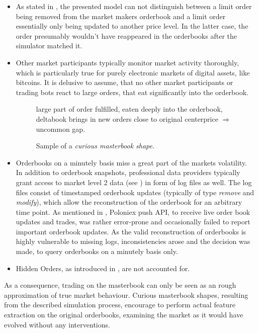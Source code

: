 \begin{itemize}
\item As stated in , the presented model can not distinguish between a limit order being removed from the market makers orderbook and a limit order essentially only being updated to another price level. In the latter case, the order presumably wouldn't have reappeared in the orderbooks after the simulator matched it.
\item Other market participants typically monitor market activity thoroughly, which is particularly true for purely electronic markets of digital assets, like bitcoins. It is delusive to assume, that no other market participants or trading bots react to large orders, that eat significantly into the orderbook.\\

\begin{figure}[ht]
	\centering
	[placeholder]
	\caption{Sample of a \emph{curious masterbook shape}.}
	large part of order fulfilled, eaten deeply into the orderbook, deltabook brings in new orders close to original centerprice $\Rightarrow$ uncommon gap.
	\label{fig:masterbook:curiousshape}
\end{figure}

\item Orderbooks on a minutely basis miss a great part of the markets volatility. \\
In addition to orderbook snapshots, professional data providers typically grant access to market level 2 data (see ) in form of log files as well. The log files consist of timestamped orderbook updates (typically of type \emph{remove} and \emph{modify}), which allow the reconstruction of the orderbook for an arbitrary time point. As mentioned in , Poloniex push API, to receive live order book updates and trades, was rather error-prone and occasionally failed to report important orderbook updates. As the valid reconstruction of orderbooks is highly vulnerable to missing logs, inconsistencies arose and the decision was made, to query orderbooks on a minutely basis only.
\item Hidden Orders, as introduced in , are not accounted for.
\end{itemize}

As a consequence, trading on the masterbook can only be seen as an rough approximation of true market behaviour. Curious masterbook shapes, resulting from the described simulation process, encourage to perform actual feature extraction on the original orderbooks, examining the market as it would have evolved without any interventions.







\cleardoublepage{}